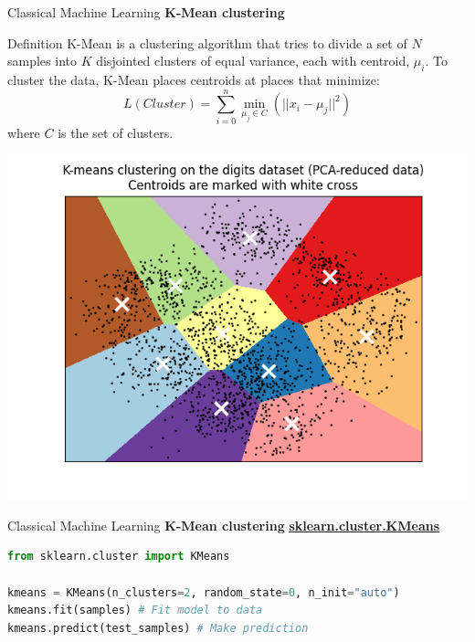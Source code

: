 \documentclass{beamer}
\begin{document}
\begin{frame}[fragile]{Classical Machine Learning}
    \textbf{K-Mean clustering}
    \begin{block}{Definition}
        K-Mean is a clustering algorithm that tries to divide a set of $N$ samples into $K$ disjointed clusters of equal variance, each with centroid, $\mu_{i}$. To cluster the data, K-Mean places centroids at places that minimize:
        \vspace{-0.5cm}
        \begin{equation*}
            L(Cluster) = \sum_{i=0}^{n}\min\limits_{\mu_{j}\in C}(||x_{i} - \mu_{j}||^2)
        \end{equation*}
        where $C$ is the set of clusters.
        \begin{center}
            \includegraphics[width=.30\textwidth,height=\textheight,keepaspectratio]{figures/k_mean.png}
        \end{center}
    \end{block}
\end{frame}
\begin{frame}[fragile]{Classical Machine Learning}
    \textbf{K-Mean clustering}
    \href{https://scikit-learn.org/stable/modules/generated/sklearn.cluster.KMeans.html}{\textbf{\underline{sklearn.cluster.KMeans}}}
    \begin{example}
        \begin{lstlisting}[language=Python]
from sklearn.cluster import KMeans

kmeans = KMeans(n_clusters=2, random_state=0, n_init="auto")
kmeans.fit(samples) # Fit model to data
kmeans.predict(test_samples) # Make prediction
        \end{lstlisting}
    \end{example}
\end{frame}
\end{document}
